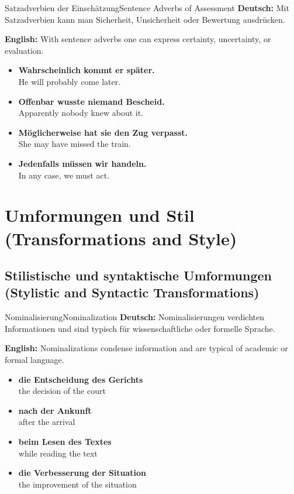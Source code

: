 \documentclass[a4paper,11pt]{article}
\newcommand{\GermanText}[1]{\textbf{Deutsch: }#1\par}
\newcommand{\EnglishText}[1]{{\color{SoftGray}\textbf{English: }#1\par}}
\newcommand{\ExampleItem}[2]{\item \textbf{#1}\\{\color{SoftGray}#2}}
\begin{document}
\begin{grammarentry}{Satzadverbien der Einschätzung}{Sentence Adverbs of Assessment}
    \GermanText{Mit Satzadverbien kann man Sicherheit, Unsicherheit oder Bewertung ausdrücken.}
    \EnglishText{With sentence adverbs one can express certainty, uncertainty, or evaluation.}
    \begin{exbox}
        \begin{itemize}
            \ExampleItem{Wahrscheinlich kommt er später.}{He will probably come later.}
            \ExampleItem{Offenbar wusste niemand Bescheid.}{Apparently nobody knew about it.}
            \ExampleItem{Möglicherweise hat sie den Zug verpasst.}{She may have missed the train.}
            \ExampleItem{Jedenfalls müssen wir handeln.}{In any case, we must act.}
        \end{itemize}
    \end{exbox}
\end{grammarentry}

\section{Umformungen und Stil {\small (Transformations and Style)}}

\subsection{Stilistische und syntaktische Umformungen {\small (Stylistic and Syntactic Transformations)}}

\begin{grammarentry}{Nominalisierung}{Nominalization}
    \GermanText{Nominalisierungen verdichten Informationen und sind typisch für wissenschaftliche oder formelle Sprache.}
    \EnglishText{Nominalizations condense information and are typical of academic or formal language.}
    \begin{exbox}
        \begin{itemize}
            \ExampleItem{die Entscheidung des Gerichts}{the decision of the court}
            \ExampleItem{nach der Ankunft}{after the arrival}
            \ExampleItem{beim Lesen des Textes}{while reading the text}
            \ExampleItem{die Verbesserung der Situation}{the improvement of the situation}
        \end{itemize}
    \end{exbox}
\end{grammarentry}
\end{document}
